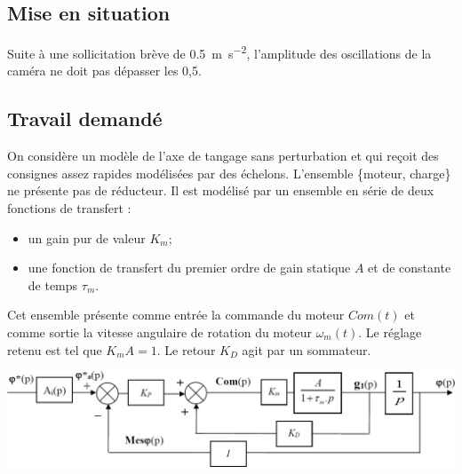 \documentclass[10pt,fleqn]{article} %
\begin{document}
\def\pathfig{images}

\vspace{5cm}
\pagestyle{fancy}
\thispagestyle{plain}

\def\columnseprulecolor{\color{ocre}}
\setlength{\columnseprule}{0.4pt} 

\def\pathfig{images}

\ifprof
\else
\begin{multicols}{2}
\fi

\subsection*{Mise en situation}
 \ifprof
 \else



\begin{obj}
Suite à une sollicitation brève de \SI{0,5}{m.s^{-2}}, l'amplitude des oscillations de la caméra ne doit pas dépasser les 0,5\degres.
\end{obj}

\subsection*{Travail demandé}

On considère un modèle de l’axe de tangage sans perturbation et qui reçoit des consignes assez rapides modélisées par
des échelons.
L’ensemble \{moteur, charge\} ne présente pas de réducteur. Il est modélisé par un ensemble en série de deux fonctions
de transfert :
\begin{itemize}
\item un gain pur de valeur $K_m$;%
\item une fonction de transfert du premier ordre de gain statique $A$ et de constante de temps $\tau_m$.
\end{itemize}
Cet ensemble présente comme entrée la commande du moteur $Com(t)$ et comme sortie la vitesse angulaire de rotation
du moteur $\omega_m(t)$. Le réglage retenu est tel que $K_m A = 1$. Le retour $K_D$ agit par un sommateur.

\begin{center}
\includegraphics[width=\linewidth]{images/fig_01}


\end{center}
\end{multicols}
\end{document}
